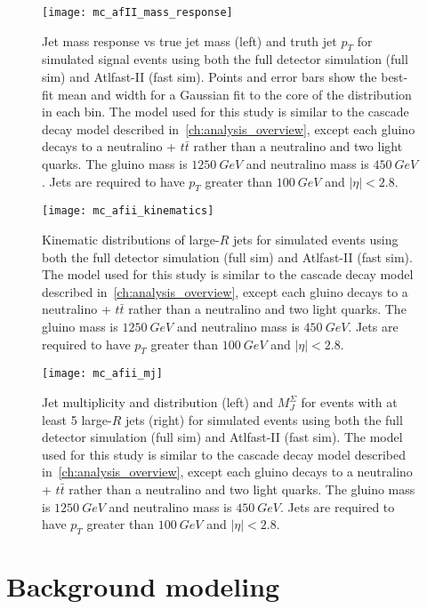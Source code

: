 \begin{figure}[!ht]\centering
    \texttt{[image: mc\_afII\_mass\_response]}
    \caption{Jet mass response vs true jet mass (left) and truth jet $p_{T}$ for simulated signal events using both the full detector simulation (full sim) and Atlfast-II (fast sim).
    Points and error bars show the best-fit mean and width for a Gaussian fit to the core of the distribution in each bin.
    The model used for this study is similar to the cascade decay model described in~\ref{ch:analysis_overview}, except each gluino decays to a neutralino + $t\bar{t}$ rather than a neutralino and two light quarks.
    The gluino mass is $1250~GeV$ and neutralino mass is $450~GeV$.
    Jets are required to have $p_{T}$ greater than $100~GeV$ and $|\eta|<2.8$.
    }
    \label{fig:afii_mass_response}
\end{figure}

\begin{figure}[!ht]\centering
    \texttt{[image: mc\_afii\_kinematics]}
    \caption{Kinematic distributions of large-$R$ jets for simulated events using both the full detector simulation (full sim) and Atlfast-II (fast sim).
    The model used for this study is similar to the cascade decay model described in~\ref{ch:analysis_overview}, except each gluino decays to a neutralino + $t\bar{t}$ rather than a neutralino and two light quarks.
    The gluino mass is $1250~GeV$ and neutralino mass is $450~GeV$.
    Jets are required to have $p_{T}$ greater than $100~GeV$ and $|\eta|<2.8$.
    }
    \label{fig:afii_kinematics}
\end{figure}

\begin{figure}[!ht]\centering
    \texttt{[image: mc\_afii\_mj]}
    \caption{Jet multiplicity and distribution (left) and $M_{J}^{\Sigma}$ for events with at least 5 large-$R$ jets (right) for simulated events using both the full detector simulation (full sim) and Atlfast-II (fast sim).
    The model used for this study is similar to the cascade decay model described in~\ref{ch:analysis_overview}, except each gluino decays to a neutralino + $t\bar{t}$ rather than a neutralino and two light quarks.
    The gluino mass is $1250~GeV$ and neutralino mass is $450~GeV$.
    Jets are required to have $p_{T}$ greater than $100~GeV$ and $|\eta|<2.8$.}
    \label{fig:afii_mj}
\end{figure}

\section{Background modeling}\label{sec:bkg_modeling}

